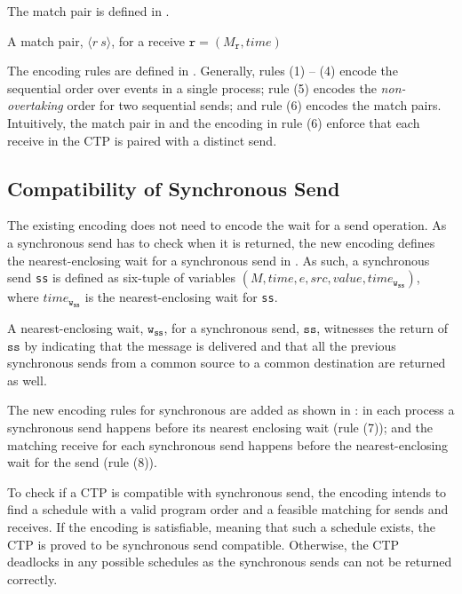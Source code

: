 The match pair is defined in .
\begin{definition}
A match pair, $\langle r\ s\rangle$, for a receive $\mathtt{r}=(M_\mathtt{r},\mathit{time})$
\label{def:mp}
\end{definition}

The encoding rules are defined in \figref{}. Generally, rules (1) -- (4) encode the sequential order over events in a single process; rule (5) encodes the \emph{non-overtaking} order for two sequential sends; and rule (6) encodes the match pairs. Intuitively, the match pair in  and the encoding in rule (6) enforce that each receive in the CTP is paired with a distinct send. 

\setcounter{equation}{0}
\encodingptp

\subsection{Compatibility of Synchronous Send}

The existing encoding does not need to encode the wait for a send operation. As a synchronous send has to check when it is returned, the new encoding defines the nearest-enclosing wait for a synchronous send in . As such, a synchronous send \texttt{ss} is defined as six-tuple of variables $(M,\mathit{time},e,\mathit{src},\mathit{value},\mathit{time}_\mathtt{w_{ss}})$, where $\mathit{time}_\mathtt{w_{ss}}$ is the nearest-enclosing wait for \texttt{ss}.

\begin{definition}
A nearest-enclosing wait, $\mathtt{w}_\mathtt{ss}$, for a synchronous send, $\mathtt{ss}$, witnesses the return of $\mathtt{ss}$ by indicating that the message is delivered and that all the previous synchronous sends from a common source to a common destination are returned as well.
\end{definition}

The new encoding rules for synchronous are added as shown in : in each process a synchronous send happens before its nearest enclosing wait (rule (7)); and the matching receive for each synchronous send happens before the nearest-enclosing wait for the send (rule (8)).

\encodingsync

To check if a CTP is compatible with synchronous send, the encoding intends to find a schedule with a valid program order and a feasible matching for sends and receives. If the encoding is satisfiable, meaning that such a schedule exists, the CTP is proved to be synchronous send compatible. Otherwise, the CTP deadlocks in any possible schedules as the synchronous sends can not be returned correctly.


